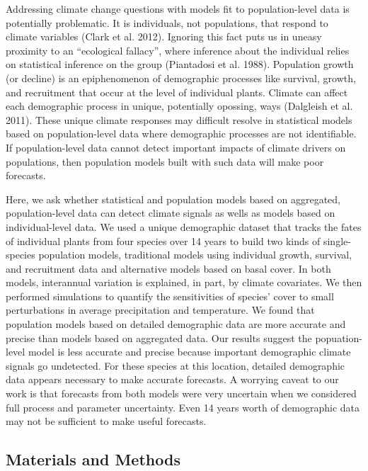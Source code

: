 \documentclass[12pt,]{article}
\begin{document}
Addressing climate change questions with models fit to population-level
data is potentially problematic. It is individuals, not populations,
that respond to climate variables (Clark et al. 2012). Ignoring this
fact puts us in uneasy proximity to an ``ecological fallacy'', where
inference about the individual relies on statistical inference on the
group (Piantadosi et al. 1988). Population growth (or decline) is an
epiphenomenon of demographic processes like survival, growth, and
recruitment that occur at the level of individual plants. Climate can
affect each demographic process in unique, potentially opossing, ways
(Dalgleish et al. 2011). These unique climate responses may difficult
resolve in statistical models based on population-level data where
demographic processes are not identifiable. If population-level data
cannot detect important impacts of climate drivers on populations, then
population models built with such data will make poor forecasts.

Here, we ask whether statistical and population models based on
aggregated, population-level data can detect climate signals as wells as
models based on individual-level data. We used a unique demographic
dataset that tracks the fates of individual plants from four species
over 14 years to build two kinds of single-species population models,
traditional models using individual growth, survival, and recruitment
data and alternative models based on basal cover. In both models,
interannual variation is explained, in part, by climate covariates. We
then performed simulations to quantify the sensitivities of species'
cover to small perturbations in average precipitation and temperature.
We found that population models based on detailed demographic data are
more accurate and precise than models based on aggregated data. Our
results suggest the popuation-level model is less accurate and precise
because important demographic climate signals go undetected. For these
species at this location, detailed demographic data appears necessary to
make accurate forecasts. A worrying caveat to our work is that forecasts
from both models were very uncertain when we considered full process and
parameter uncertainty. Even 14 years worth of demographic data may not
be sufficient to make useful forecasts.

\subsection{Materials and Methods}\label{materials-and-methods}
\end{document}
